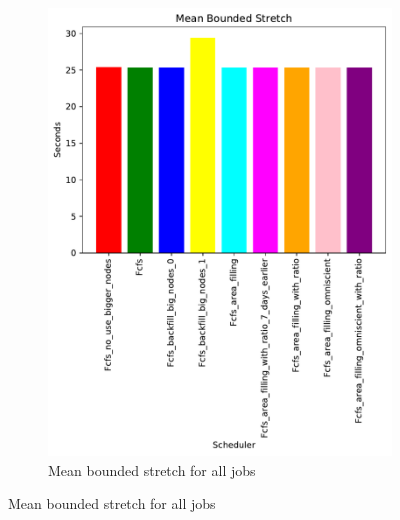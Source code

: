 \documentclass[a4paper]{article}
\begin{document}
\begin{figure}[H]\centering
\begin{subfigure}[b]{0.4\linewidth}\centering\includegraphics[width=0.95\linewidth]{MBSS/plot/Size_Constraint_2022-01-17->2022-01-17_V85105_Mean_Stretch_With_a_Minimum_450_128_32_256_4_1024.pdf}\caption{Mean bounded stretch for all jobs}\label{45}\end{subfigure}

\end{figure}
\end{document}
